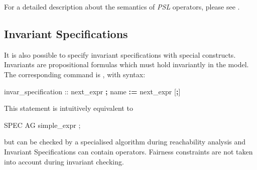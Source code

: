 For a detailed description about the semantics of \emph{PSL}
operators, please see \cite{PSLLRM}. 

\subsection{Invariant Specifications}
\label{INVAR Specifications}

It is also possible to specify invariant specifications with special
constructs. Invariants are propositional formulas which must hold
invariantly in the model.
%
The corresponding command is , with syntax:
%
\begin{Grammar}
invar_specification ::  next_expr \textbf{;}
                         name \textbf{:=} next_expr [\textbf{;}]
\end{Grammar}
%
This statement is intuitively equivalent to 
%
\begin{Grammar}
SPEC  AG simple_expr ;
\end{Grammar}
%
but can be checked by a specialised algorithm during reachability
analysis and Invariant Specifications can contain 
operators.  Fairness constraints are not taken into account during
invariant checking.

